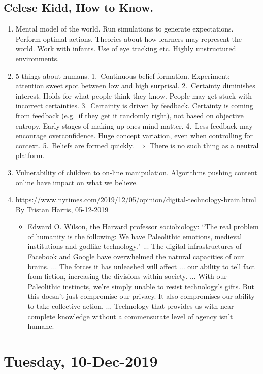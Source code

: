 \documentclass[12pt,a4paper]{article}
\begin{document}
\subsection{
Celese Kidd, How to Know.
}
\begin{enumerate}
\item Mental model of the world. Run simulations to generate expectations. Perform optimal actions.  Theories about how learners may represent the world. Work with infants. Use of eye tracking etc. Highly unstructured environments.
\item 5 things about humans. 1.~Continuous belief formation. Experiment: attention sweet spot between low and high surprisal.  2.~Certainty diminishes interest. Holds for what people think they know. People may get stuck with incorrect certainties. 3.~Certainty is driven by feedback. Certainty is coming from feedback (e.g.~if they get it randomly right), not based on objective entropy.  Early stages of making up ones mind matter. 4.~Less feedback may encourage overconfidence. Huge concept variation, even when controlling for context. 5.~Beliefs are formed quickly. $\Longrightarrow$ There is no such thing as a neutral platform.
\item Vulnerability of children to on-line manipulation. Algorithms pushing content online have impact on what we believe.
\item \url{https://www.nytimes.com/2019/12/05/opinion/digital-technology-brain.html}\\ By Tristan Harris, 05-12-2019
\begin{itemize}
\item Edward O. Wilson, the Harvard professor sociobiology: ``The real problem of humanity is the following: We have Paleolithic emotions, medieval institutions and godlike technology." ... The digital infrastructures of Facebook and Google have overwhelmed the natural capacities of our brains. ... The forces it has unleashed will affect ... our ability to tell fact from fiction, increasing the divisions within society. ... With our Paleolithic instincts, we're simply unable to resist technology's gifts. But this doesn't just compromise our privacy. It also compromises our ability to take collective action. ... Technology that provides us with near-complete knowledge without a commensurate level of agency isn't humane.
\end{itemize}
\end{enumerate}


\section{Tuesday, 10-Dec-2019}
\end{document}
